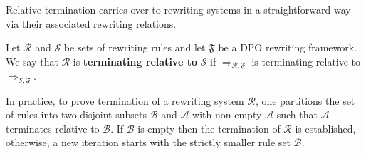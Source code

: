 Relative termination 
carries over to rewriting systems in a straightforward way via their associated rewriting relations.
\begin{definition}
    \label{termination:def:relative_termination}
     Let $\mathcal{R}$ and $\mathcal{S}$ be sets of rewriting rules and let $\mathfrak{F}$ be a DPO rewriting framework. 
     We say that 
     $\mathcal{R}$ is \textbf{terminating relative to} $\mathcal{S}$ 
     if 
     $\mathop{\Rightarrow}_{\mathcal{R},\mathfrak{F}}$ is terminating relative to $\mathop{\Rightarrow}_{\mathcal{S}, \mathfrak{F}}$.
\end{definition}
In practice, to prove termination of a rewriting system $\mathcal{R}$, one partitions the set of rules into two disjoint subsets \( \mathcal{B} \) and \( \mathcal{A} \) with non-empty $\mathcal{A}$ such that \( \mathcal{A} \) terminates relative to \( \mathcal{B} \). 
If $\mathcal{B}$ is empty then the termination of $\mathcal{R}$ is established, otherwise, a new iteration starts with the strictly smaller rule set $\mathcal{B}$.
 